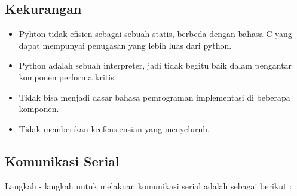 	\subsection{Kekurangan}
		\begin{itemize}
			\item Pyhton tidak efisien sebagai sebuah statis, berbeda dengan bahasa C yang dapat mempunyai penugasan yang lebih luas dari python.
			\item Python adalah sebuah interpreter, jadi tidak begitu baik dalam pengantar komponen performa kritis.
			\item Tidak bisa menjadi dasar bahasa pemrograman implementasi di beberapa komponen.
			\item Tidak memberikan keefensiensian yang menyeluruh.
		\end{itemize}
		
	\subsection{Komunikasi Serial}
		Langkah - langkah untuk melakuan komunikasi serial adalah sebagai berikut :
		

